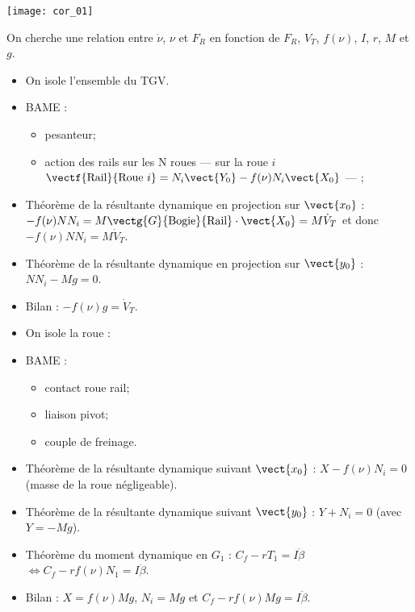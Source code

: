\begin{center}
\texttt{[image: cor\_01]}
\end{center}

On cherche une relation entre $\dot{\nu}$, $\nu$ et $F_R$ en fonction de $F_R$, $V_T$, $f(\nu)$, $I$, $r$, $M$ et $g$.

\begin{itemize}
\item On isole l'ensemble du TGV. 
\item BAME :
\begin{itemize}
\item pesanteur;
\item action des rails sur les N roues --- sur la roue $i$ $\vectf{\text{Rail}}{\text{Roue } i} = N_i \vect{Y_0}-f(\nu)N_i \vect{X_0}$ --- ;
\end{itemize}
\item Théorème de la résultante dynamique en projection sur $\vect{x_0}$ : $-f(\nu) N N_i  = M \vectg{G}{\text{Bogie}}{\text{Rail}}\cdot\vect{X_0} = M\dot{V}_T$ et donc $-f(\nu) N N_i = M\dot{V}_T$.
\item Théorème de la résultante dynamique en projection sur $\vect{y_0}$ : $ N N_i  - Mg = 0$.
\item Bilan :  $-f(\nu) g = \dot{V}_T$.
\end{itemize}

\vspace{.5cm}

\begin{itemize}
\item On isole la roue :
\item BAME :
\begin{itemize}
\item contact roue rail;
\item liaison pivot;
\item couple de freinage.
\end{itemize}
\item Théorème de la résultante dynamique suivant $\vect{x_0}$ : $X-f(\nu)N_i=0$ (masse de la roue négligeable).
\item Théorème de la résultante dynamique suivant $\vect{y_0}$ : $Y+N_i=0$ (avec $Y=-Mg$).
\item Théorème du moment dynamique en $G_1$ : $C_f -rT_1 = I\ddot{\beta}$ $\Leftrightarrow C_f -rf(\nu)N_1 = I\ddot{\beta}$.
\item Bilan : $X=f(\nu)Mg$, $N_i=Mg $ et $C_f -rf(\nu)Mg = I\ddot{\beta}$.
\end{itemize}

